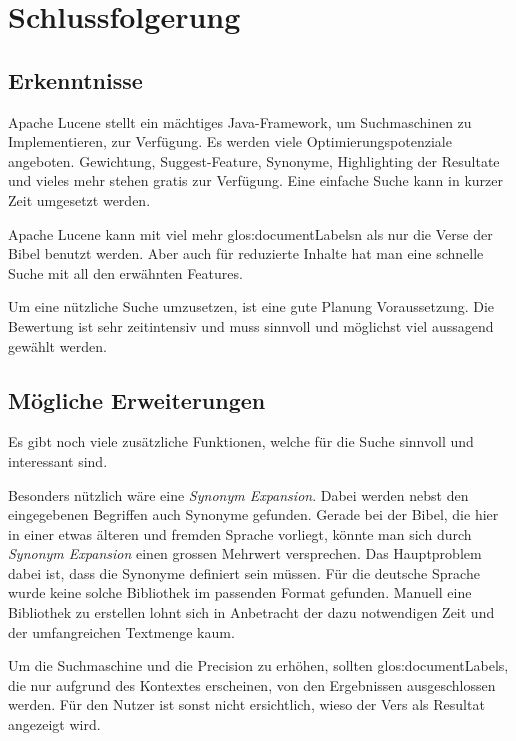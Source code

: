 \chapter{Schlussfolgerung}

\section{Erkenntnisse}
Apache Lucene stellt ein mächtiges Java-Framework, um Suchmaschinen zu Implementieren, zur Verfügung.
Es werden viele Optimierungspotenziale angeboten. Gewichtung, Suggest-Feature, Synonyme, Highlighting der Resultate und vieles mehr stehen gratis zur Verfügung.
Eine einfache Suche kann in kurzer Zeit umgesetzt werden.

Apache Lucene kann mit viel mehr \glspl{glos:documentLabel}n als nur die Verse der Bibel benutzt werden. Aber auch für reduzierte Inhalte hat man eine schnelle Suche mit all den erwähnten Features.

Um eine nützliche Suche umzusetzen, ist eine gute Planung Voraussetzung. Die Bewertung ist sehr zeitintensiv und muss sinnvoll und möglichst viel aussagend gewählt werden.

\section{Mögliche Erweiterungen}
Es gibt noch viele zusätzliche Funktionen, welche für die Suche sinnvoll und interessant sind.

Besonders nützlich wäre eine \textit{Synonym Expansion}. Dabei werden nebst den eingegebenen Begriffen auch Synonyme gefunden.
Gerade bei der Bibel, die hier in einer etwas älteren und fremden Sprache vorliegt, könnte man sich durch \textit{Synonym Expansion} einen grossen Mehrwert versprechen.
Das Hauptproblem dabei ist, dass die Synonyme definiert sein müssen.
Für die deutsche Sprache wurde keine solche Bibliothek im passenden Format gefunden.
Manuell eine Bibliothek zu erstellen lohnt sich in Anbetracht der dazu notwendigen Zeit und der umfangreichen Textmenge kaum.

Um die Suchmaschine und die Precision zu erhöhen, sollten \glspl{glos:documentLabel}, die nur aufgrund des Kontextes erscheinen, von den Ergebnissen ausgeschlossen werden. Für den Nutzer ist sonst nicht ersichtlich, wieso der Vers als Resultat angezeigt wird.


